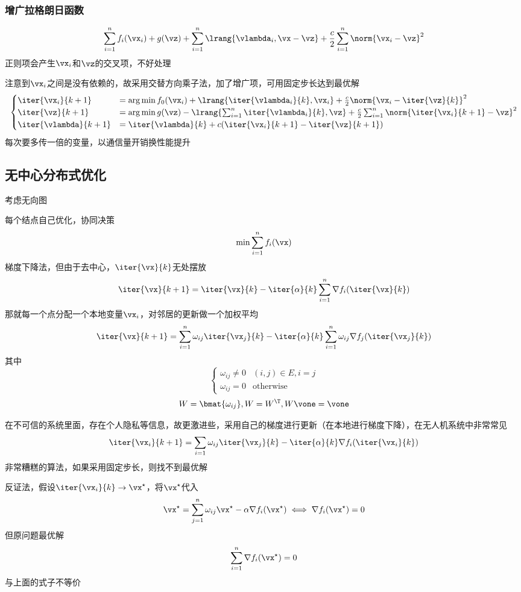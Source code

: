 \subsubsection{增广拉格朗日函数}
\[\sum_{i=1}^nf_i(\vx_i)+g(\vz)+\sum_{i=1}^n\lrang{\vlambda_i,\vx-\vz}+\frac{c}{2}\sum_{i=1}^n\norm{\vx_i-\vz}^2\]
正则项会产生$\vx_i$和$\vz$的交叉项，不好处理

注意到$\vx_i$之间是没有依赖的，故采用交替方向乘子法，加了增广项，可用固定步长达到最优解
\[\begin{cases}
    \iter{\vx_i}{k+1}&=\arg\min f_0(\vx_i)+\lrang{\iter{\vlambda_i}{k},\vx_i}+\frac{c}{2}\norm{\vx_i-\iter{\vz}{k}}^2\\
    \iter{\vz}{k+1}&=\arg\min g(\vz)-\lrang{\sum_{i=1}^n\iter{\vlambda_i}{k},\vz}+\frac{c}{2}\sum_{i=1}^n\norm{\iter{\vx_i}{k+1}-\vz}^2\\
    \iter{\vlambda}{k+1}&=\iter{\vlambda}{k}+c(\iter{\vx_i}{k+1}-\iter{\vz}{k+1})
\end{cases}\]
每次要多传一倍的变量，以通信量开销换性能提升

\subsection{无中心分布式优化}
\par 考虑无向图
\begin{center}
\end{center}
每个结点自己优化，协同决策
\[\min\sum_{i=1}^n f_i(\vx)\]
梯度下降法，但由于去中心，$\iter{\vx}{k}$无处摆放
\[\iter{\vx}{k+1}=\iter{\vx}{k}-\iter{\alpha}{k}\sum_{i=1}^n\nabla f_i(\iter{\vx}{k})\]
那就每一个点分配一个本地变量$\vx_i$，对邻居的更新做一个加权平均
\[\iter{\vx}{k+1}=\sum_{i=1}^n\omega_{ij}\iter{\vx_j}{k}-\iter{\alpha}{k}\sum_{i=1}^n\omega_{ij}\nabla f_j(\iter{\vx_j}{k})\]
其中
\[\begin{cases}
    \omega_{ij}\ne 0 & (i,j)\in E, i=j\\
    \omega_{ij}=0 & \text{otherwise}
\end{cases}\]
\[W=\bmat{\omega_{ij}},W=W^\T,W\vone=\vone\]

在不可信的系统里面，存在个人隐私等信息，故更激进些，采用自己的梯度进行更新（在本地进行梯度下降），在无人机系统中非常常见
\[\iter{\vx_i}{k+1}=\sum_{i=1}\omega_{ij}\iter{\vx_j}{k}-\iter{\alpha}{k}\nabla f_i(\iter{\vx_i}{k})\]
非常糟糕的算法，如果采用固定步长，则找不到最优解
\begin{analysis}
反证法，假设$\iter{\vx_i}{k}\to \vx^\star$，将$\vx^\star$代入
\[\vx^\star=\sum_{j=1}^n\omega_{ij}\vx^\star-\alpha\nabla f_i(\vx^\star)\iff \nabla f_i(\vx^\star)=0\]
但原问题最优解
\[\sum_{i=1}^n\nabla f_i(\vx^\star)=0\]
与上面的式子不等价
\end{analysis}

